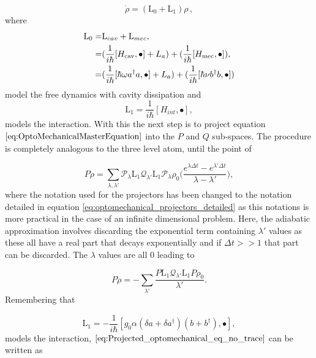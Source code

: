 \documentclass[12pt]{article}
\begin{document}
\begin{equation}
\dot{\rho}=(\mathrm{L}_0+\mathrm{L}_1)\rho\, ,
\end{equation}
where
\begin{eqnarray}\label{eq:freelindblat}
\mathrm{L}_0=&\mathrm{L}_{cav} + \mathrm{L}_{mec},\\
 =&(\frac{1}{i\hbar}[H_{\rm cav},\bullet]+L_a) +(\frac{1}{i\hbar}[H_{\rm mec},\bullet]), \nonumber\\
 =&(\frac{1}{i\hbar}[\hbar \omega a^\dagger a,\bullet]+L_a) +(\frac{1}{i\hbar}[ \hbar\nu b^\dagger b ,\bullet]) 
\end{eqnarray} model the free dynamics with cavity dissipation and
\begin{equation}
\mathrm{L}_1 = \frac{1}{i\hbar}[H_{int},\bullet],
\end{equation} models the interaction. With this the next step is to project equation $\eqref{eq:OptoMechanicalMasterEquation}$ into the $P$ and $Q$ sub-spaces. The procedure is completely analogous to the three level atom, until the point of 

\begin{equation}
    P\dot{\rho}=\sum_{\lambda, \lambda'} \mathcal{P}_{\lambda} \mathrm{L}_1  \mathcal{Q}_{\lambda'}\mathrm{L}_1\mathcal{P}_{\lambda} \rho_0\Bigg(\frac{e^{\lambda\Delta t}-e^{\lambda' \Delta t}}{\lambda-\lambda'}\Bigg),
\end{equation} where the notation used for the projectors has been changed to the notation detailed in equation \ref{eq:optomechanical_projectors_detailed} as this notations is more practical in the case of an infinite dimensional problem. Here, the adiabatic approximation involves discarding the exponential term containing $\lambda'$ values as these all have a real part that decays exponentially and if $\Delta t >> 1$ that part can be discarded. The $\lambda$ values are all 0 leading to

\begin{equation}\label{eq:Projected_optomechanical_eq_no_trace}
    P\dot{\rho}=-\sum_{\lambda'} \frac{ P \mathrm{L}_1  \mathcal{Q}_{\lambda'}\mathrm{L}_1P \rho_0}{\lambda'}.
\end{equation} Remembering that 

\begin{equation}
\mathrm{L}_1 = -\frac{1}{i\hbar}[g_0\alpha (\delta a +  \delta a^\dagger)  (b+b^\dagger),\bullet],
\end{equation} models the interaction, $\eqref{eq:Projected_optomechanical_eq_no_trace}$ can be written as
\end{document}
